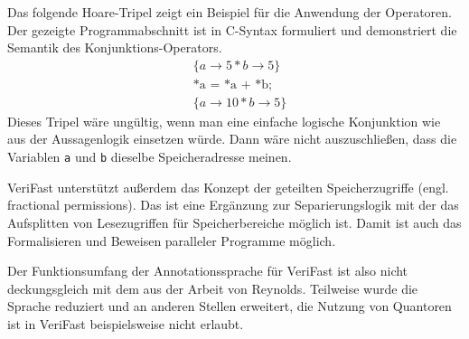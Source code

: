 Das folgende Hoare-Tripel zeigt ein Beispiel für die Anwendung der Operatoren. Der gezeigte Programmabschnitt ist in C-Syntax
formuliert und demonstriert die Semantik des Konjunktions-Operators.
\begin{align*}
& \{a \to 5 \ast b \to 5 \} \\
& \text{*a = *a + *b;} \\
& \{a \to 10 \ast b \to 5\}
\end{align*}
Dieses Tripel wäre ungültig, wenn man eine einfache logische Konjunktion wie aus der Aussagenlogik einsetzen würde. Dann
wäre nicht auszuschließen, dass die Variablen \lstinline{a} und \lstinline{b} dieselbe Speicheradresse meinen.

VeriFast unterstützt außerdem das Konzept der geteilten Speicherzugriffe (engl. fractional permissions). Das
ist eine Ergänzung zur Separierungslogik mit der das Aufsplitten von Lesezugriffen für Speicherbereiche möglich ist\cite{concurrent}.
Damit ist auch das Formalisieren und Beweisen paralleler Programme möglich.  

Der Funktionsumfang der Annotationssprache für VeriFast ist also nicht deckungsgleich mit dem aus der Arbeit von Reynolds.
Teilweise wurde die Sprache reduziert und an anderen Stellen erweitert, die Nutzung von Quantoren ist in VeriFast beispielsweise
nicht erlaubt.
